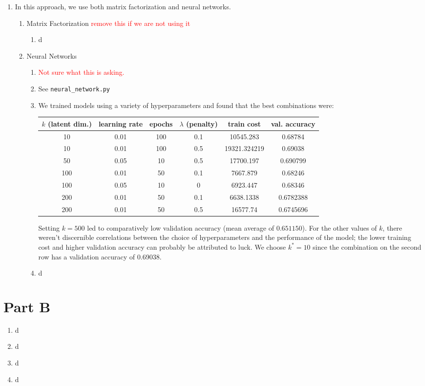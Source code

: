 \documentclass{article}
\begin{document}
\begin{enumerate}[label=\arabic*.]
    \item In this approach, we use both matrix factorization and neural networks.
        \begin{enumerate}[label=(\roman*)]
            \item Matrix Factorization \textcolor{red}{remove this if we are not using it}
                \begin{enumerate}[label=(\alph*)]
                    \item d
                \end{enumerate}
            \item Neural Networks
                \begin{enumerate}[label=(\alph*)]
                    \item \textcolor{red}{Not sure what this is asking.}
                    \item See \texttt{neural\_network.py}
                    \item We trained models using a variety of hyperparameters and found that the best combinations were:
                    \begin{center}
                        \begin{tabular}{c|c|c|c|c|c}
                            $k$ (latent dim.) & learning rate & epochs & $\lambda$ (penalty) & train cost & val. accuracy \\\hline
                            10 & 0.01 & 100 & 0.1 & 10545.283 & 0.68784 \\
                            10 & 0.01 & 100 & 0.5 & 19321.324219 & 0.69038 \\
                            50 & 0.05 & 10  & 0.5 & 17700.197 & 0.690799 \\
                            100 & 0.01 & 50 & 0.1 & 7667.879 & 0.68246 \\
                            100 & 0.05 & 10 & 0 & 6923.447 & 0.68346 \\
                            200 & 0.01 & 50 & 0.1 & 6638.1338 & 0.6782388 \\
                            200 & 0.01 & 50 & 0.5 & 16577.74 & 0.6745696 
                        \end{tabular}
                    \end{center}
                    Setting $k=500$ led to comparatively low validation accuracy (mean average of $0.651150$). For the other values of $k$, there weren't discernible correlations between the choice of hyperparameters and the performance of the model; the lower training cost and higher validation accuracy can probably be attributed to luck. We choose $k^*=10$ since the combination on the second row has a validation accuracy of 0.69038.
                \item d
                \end{enumerate}
        \end{enumerate}
\end{enumerate}
\section{Part B}
\begin{enumerate}[label=\arabic*.]
    \item d
    \item d
    \item d
    \item d
\end{enumerate}
\end{document}
